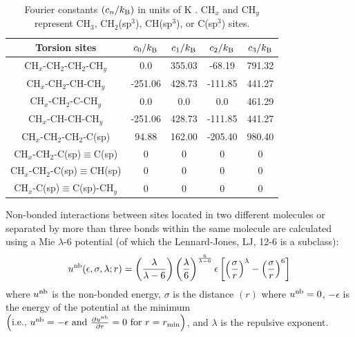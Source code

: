 \documentclass[journal=jced,manuscript=article]{achemso}
\begin{document}
    \begin{table}[h!]
		\caption{Fourier constants $(c_n/k_{\rm B})$ in units of K \cite{Martin1999,Nath2001,Potoff_branched,Barhaghi2017}. CH$_x$ and CH$_y$ represent CH$_3$, CH$_2$(sp$^3$), CH(sp$^3$), or C(sp$^3$) sites.} \label{tab:torsions}
		\begin{center}
			\begin{tabular}{|c|c|c|c|c|}
				\hline
				Torsion sites & $c_0/k_{\rm B}$ & $c_1/k_{\rm B}$ & $c_2/k_{\rm B}$ & $c_3/k_{\rm B}$ \\ \hline
				CH$_x$-CH$_2$-CH$_2$-CH$_y$ & 0.0 & 355.03 & -68.19 & 791.32 \\ 
				CH$_x$-CH$_2$-CH-CH$_y$ & -251.06 & 428.73 & -111.85 & 441.27 \\
				CH$_x$-CH$_2$-C-CH$_y$ & 0.0 & 0.0 & 0.0 & 461.29 \\
				CH$_x$-CH-CH-CH$_y$ & -251.06 & 428.73 & -111.85 & 441.27 \\
				CH$_x$-CH$_2$-CH$_2$-C(sp) & 94.88 & 162.00 & -205.40 & 980.40 \\
				CH$_x$-CH$_2$-C(sp)$\equiv$C(sp) & 0 & 0 & 0 & 0 \\
				CH$_x$-CH$_2$-C(sp)$\equiv$CH(sp) & 0 & 0 & 0 & 0 \\
				CH$_x$-C(sp)$\equiv$C(sp)-CH$_y$ & 0 & 0 & 0 & 0 \\
				\hline
			\end{tabular}
		\end{center} 
	\end{table}
    
    Non-bonded interactions between sites located in two different molecules or separated by more than three bonds within the same molecule are calculated using a Mie $\lambda$-6 potential (of which the Lennard-Jones, LJ, 12-6 is a subclass):
    \begin{equation} \label{eq:Mie}
    u^{\rm nb}(\epsilon,\sigma,\lambda;r) = \left(\frac{\lambda}{\lambda - 6}\right)\left(\frac{\lambda}{6}\right)^{\frac{6}{\lambda - 6}} \epsilon \left[\left(\frac{\sigma}{r}\right)^{\lambda} - \left(\frac{\sigma}{r}\right)^6\right]
    \end{equation} 
    where $u^{\rm nb}$ is the non-bonded energy, $\sigma$ is the distance $(r)$ where $u^{\rm nb} = 0$, $-\epsilon$ is the energy of the potential at the minimum $\left(\text{i.e., }u^{\rm nb} = -\epsilon \text{ and } \frac{\partial u^{\rm nb}}{\partial r} = 0 \text{ for } r=r_{\rm min} \right)$, and $\lambda$ is the repulsive exponent. 
    
\end{document}
